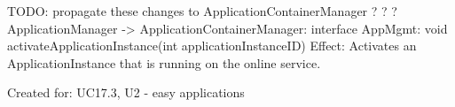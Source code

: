                 TODO: propagate these changes to ApplicationContainerManager ? ? ?
                ApplicationManager -> ApplicationContainerManager: interface AppMgmt: void activateApplicationInstance(int applicationInstanceID)
                    Effect: Activates an ApplicationInstance that is running on the online service.
                    \item Created for: UC17.3, U2 - easy applications
